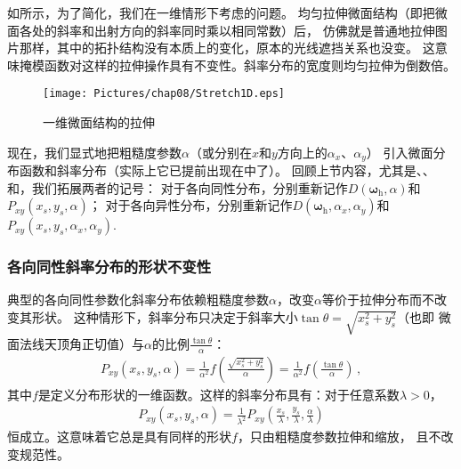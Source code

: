 如所示，为了简化，我们在一维情形下考虑的问题。
均匀拉伸微面结构（即把微面各处的斜率和出射方向的斜率同时乘以相同常数）后，
仿佛就是普通地拉伸图片那样，其中的拓扑结构没有本质上的变化，原本的光线遮挡关系也没变。
这意味掩模函数对这样的拉伸操作具有不变性。斜率分布的宽度则均匀拉伸为倒数倍。

\begin{figure}[htbp]
    \centering
    \texttt{[image: Pictures/chap08/Stretch1D.eps]}
    \caption{一维微面结构的拉伸}
    \label{fig:08ex01-Stretch1D}
\end{figure}

现在，我们显式地把粗糙度参数$\alpha$（或分别在$x$和$y$方向上的$\alpha_x$、$\alpha_y$）
引入微面分布函数和斜率分布（实际上它已提前出现在中了）。
回顾上节内容，尤其是、、
和，我们拓展两者的记号：
对于各向同性分布，分别重新记作$D({\bm\omega}_{\mathrm{h}},\alpha)$和$P_{xy}(x_s,y_s,\alpha)$；
对于各向异性分布，分别重新记作$D({\bm\omega}_{\mathrm{h}},\alpha_x,\alpha_y)$和$P_{xy}(x_s,y_s,\alpha_x,\alpha_y)$.

\subsubsection*{各向同性斜率分布的形状不变性}
典型的各向同性参数化斜率分布依赖粗糙度参数$\alpha$，改变$\alpha$等价于拉伸分布而不改变其形状。
这种情形下，斜率分布只决定于斜率大小$\displaystyle\tan\theta=\sqrt{x_s^2+y_s^2}$（也即
微面法线天顶角正切值）与$\alpha$的比例$\displaystyle\frac{\tan\theta}{\alpha}$：
\begin{align}\label{eq:08-ex01-isotropic-shape-invariant}
    P_{xy}(x_s,y_s,\alpha)=\frac{1}{\alpha^2}f\left(\frac{\sqrt{x_s^2+y_s^2}}{\alpha}\right)=\frac{1}{\alpha^2}f\left(\frac{\tan\theta}{\alpha}\right)\, ,
\end{align}
其中$f$是定义分布形状的一维函数。这样的斜率分布具有：对于任意系数$\lambda>0$，
\begin{align}\label{eq:08-ex01-any-coef-invariant}
    P_{xy}(x_s,y_s,\alpha)=\frac{1}{\lambda^2}P_{xy}(\frac{x_s}{\lambda},\frac{y_s}{\lambda},\frac{\alpha}{\lambda})
\end{align}
恒成立。这意味着它总是具有同样的形状$f$，只由粗糙度参数拉伸和缩放，
且不改变规范性。

